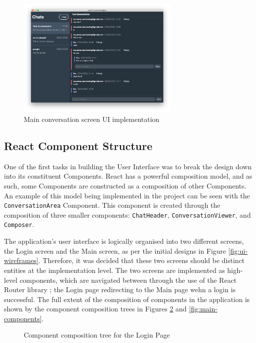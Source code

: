 \begin{figure}[h!]
  \centering
  \includegraphics[width=0.7\textwidth]{images/implementation-main.png}
  \caption{Main conversation screen UI implementation}
  \label{fig:login-ui}
\end{figure}

\subsection{React Component Structure}
One of the first tasks in building the User Interface was to break the design down into its constituent Components. React has a powerful composition model, and as such, some Components are constructed as a composition of other Components. An example of this model being implemented in the project can be seen with the \verb|ConversationArea| Component. This component is created through the composition of three smaller components: \verb|ChatHeader|, \verb|ConversationViewer|, and \verb|Composer|.

The application's user interface is logically organised into two different screens, the Login screen and the Main screen, as per the initial designs in Figure \ref{fig:ui-wireframes}. Therefore, it was decided that these two screens should be distinct entities at the implementation level. The two screens are implemented as high-level components, which are navigated between through the use of the React Router library \cite{react-router}; the Login page redirecting to the Main page wehn a login is successful. The full extent of the composition of components in the application is shown by the component composition trees in Figures \ref{fig:login-components} and \ref{fig:main-components}.

\begin{figure}[h!]
  \begin{center}
    \caption{Component composition tree for the Login Page}
    \label{fig:login-components}
  \end{center}
\end{figure}

